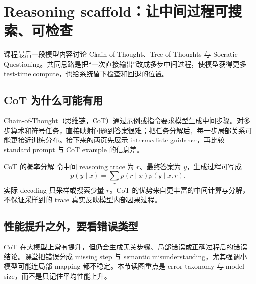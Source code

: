 \section{Reasoning scaffold：让中间过程可搜索、可检查}

课程最后一段模型内容讨论 Chain-of-Thought、Tree of Thoughts 与 Socratic Questioning。共同思路是把“一次直接输出”改成多步中间过程，使模型获得更多 test-time compute，也给系统留下检查和回退的位置。

\subsection{CoT 为什么可能有用}

Chain-of-Thought（思维链，CoT）通过示例或指令要求模型生成中间步骤。对多步算术和符号任务，直接映射问题到答案很难；把任务分解后，每一步局部关系可能更接近训练分布。接下来的两页先展示 intermediate guidance，再比较 standard prompt 与 CoT example 的信息差。



\begin{importantbox}{CoT 的概率分解}
令中间 reasoning trace 为 $r$、最终答案为 $y$，生成过程可写成
\[
p(y\mid x)=\sum_r p(r\mid x)p(y\mid x,r).
\]
实际 decoding 只采样或搜索少量 $r$。CoT 的优势来自更丰富的中间计算与分解，不保证采样到的 trace 真实反映模型内部因果过程。
\end{importantbox}


\subsection{性能提升之外，要看错误类型}

CoT 在大模型上常有提升，但仍会生成无关步骤、局部错误或正确过程后的错误结论。课堂把错误分成 missing step 与 semantic misunderstanding，尤其强调小模型可能连局部 mapping 都不稳定。本节读图重点是 error taxonomy 与 model size，而不是只记住平均性能上升。


